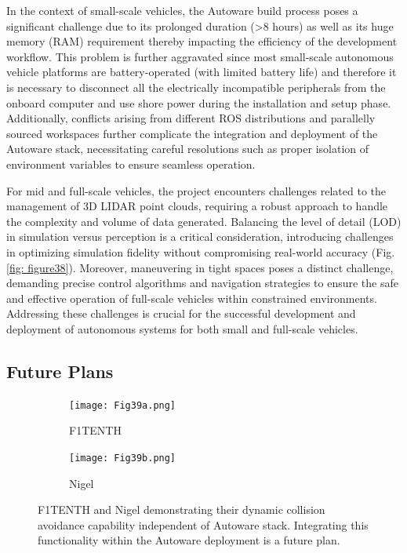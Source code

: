 In the context of small-scale vehicles, the Autoware build process poses a significant challenge due to its prolonged duration (>8 hours) as well as its huge memory (RAM) requirement thereby impacting the efficiency of the development workflow. This problem is further aggravated since most small-scale autonomous vehicle platforms are battery-operated (with limited battery life) and therefore it is necessary to disconnect all the electrically incompatible peripherals from the onboard computer and use shore power during the installation and setup phase. Additionally, conflicts arising from different ROS distributions and parallelly sourced workspaces further complicate the integration and deployment of the Autoware stack, necessitating careful resolutions such as proper isolation of environment variables to ensure seamless operation.

For mid and full-scale vehicles, the project encounters challenges related to the management of 3D LIDAR point clouds, requiring a robust approach to handle the complexity and volume of data generated. Balancing the level of detail (LOD) in simulation versus perception is a critical consideration, introducing challenges in optimizing simulation fidelity without compromising real-world accuracy (Fig. \ref{fig: figure38}). Moreover, maneuvering in tight spaces poses a distinct challenge, demanding precise control algorithms and navigation strategies to ensure the safe and effective operation of full-scale vehicles within constrained environments. Addressing these challenges is crucial for the successful development and deployment of autonomous systems for both small and full-scale vehicles.

\hypertarget{Future Plans}{%
\subsection{Future Plans}\label{Future Plans}}

\begin{figure}[h]
     \centering
     \begin{subfigure}[b]{0.49\linewidth}
         \centering
         \texttt{[image: Fig39a.png]}
         \caption{F1TENTH}
         \label{fig39a}
     \end{subfigure}
     \hfill
     \begin{subfigure}[b]{0.49\linewidth}
         \centering
         \texttt{[image: Fig39b.png]}
         \caption{Nigel}
         \label{fig39b}
     \end{subfigure}
     \caption{F1TENTH and Nigel demonstrating their dynamic collision avoidance capability independent of Autoware stack. Integrating this functionality within the Autoware deployment is a future plan.}
    \label{figure39}
\end{figure}

